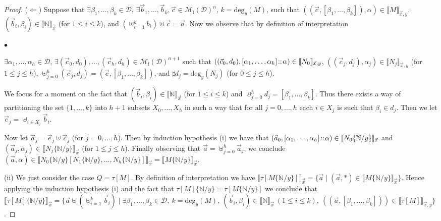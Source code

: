 \documentclass{LMCS}
\newcommand{\st}{ \mid }
\newcommand{\subst}[2]{\{ #2 / #1 \}}	\newcommand{\dg}[2]{\mathrm{deg}_{#1}(#2)} \newcommand{\obsle}{\sqsubseteq_{\mathcal{O}}}
\newcommand{\Int}[1]{\llbracket #1\rrbracket} \newcommand{\trm}[1]{#1^{\textrm{--}}}
\newcommand{\Mfin}[1]{\mathcal{M}_{\mathrm{f}}(#1)}
\newcommand{\mcup}{\uplus}
\newcommand{\seq}[1]{\vec{#1}}
\newcommand{\sN}{\mathbb{N}}
\newcommand{\gt}{\ensuremath{\tau}}
\newcommand{\cD}{\mathcal{D}}
\begin{document}
\begin{proof}
($\Leftarrow$) Suppose that $\exists \beta_1,\ldots,\beta_k \in \cD$, $\exists \seq b_1,\ldots,\seq b_k,\seq c \in \Mfin{\cD}^n$, $k=\dg{y}{M}$, such that $((\seq c,[\beta_1,\ldots,\beta_k]),\alpha) \in \Int{M}_{\seq x,y}$, $(\seq b_i,\beta_i) \in \Int{\sN}_{\seq x}$ (for $1\le i\le k$), and $(\mcup_{i=1}^{k} b_i) \mcup \seq c = \seq a$. Now we observe that by definition of interpretation
\begin{iteMize}{$\bullet$}
\item $\exists\alpha_1,\ldots,\alpha_h \in \cD$,
        $\exists (\seq c_0,d_0),\ldots,(\seq c_h ,d_h)\in \Mfin{\cD}^{n+1}$ such that
        $((\seq c_0,d_0),[\alpha_1,\ldots,\alpha_h] \at \alpha) \in \Int{N_0}_{\seq x,y}$,
        $((\seq c_j,d_j),\alpha_j) \in \Int{N_j}_{\seq x,y}$ (for $1\le j\le h$),
        $\mcup_{j=0}^{h} (\seq c_j,d_j) = (\seq c,[\beta_1,\ldots,\beta_k])$, and
        $\sharp d_j = \dg{y}{N_j}$ (for $0\le j\le h$).
\end{iteMize}
We focus for a moment on the fact that $(\seq b_i,\beta_i) \in \Int{\sN}_{\seq x}$ (for $1\le i\le k$) and $\mcup_{j=0}^{h} d_j = [\beta_1,\ldots,\beta_k]$. Thus there exists a way of partitioning the set $\{1,\ldots,k\}$ into $h+1$ subsets $X_0, \ldots, X_h$ in such a way that for all $j =0,\ldots,h$ each  $i \in X_j$ is such that $\beta_i \in d_j$. Then we let $\seq e_j = \mcup_{i \in X_j} \seq b_i$. 

Now let $\seq a_j = \seq e_j\mcup\seq c_j$ (for $j=0,\ldots,h$). Then by induction hypothesis (i) we have that $(\seq a_0,[\alpha_1,\ldots,\alpha_h] \at \alpha)\in \Int{N_0\subst{y}{\sN}}_{\seq x}$ and $(\seq a_j,\alpha_j) \in \Int{N_j\subst{y}{\sN}}_{\seq x}$ (for $1\le j\le h$). 
Finally observing that $\seq a = \mcup_{j=0}^{h} \seq a_j$, we conclude $(\seq a,\alpha)\in \Int{N_0\subst{y}{\sN}[N_1\subst{y}{\sN},\ldots,N_h\subst{y}{\sN}]}_{\seq x} = \Int{M\subst{y}{\sN}}_{\seq x}$.

(ii) We just consider the case $Q = \gt[M]$. By definition of interpretation we have $\Int{\gt[M\subst{y}{\sN}]}_{\seq x} = \{\seq a \st (\seq a,*) \in \Int{M\subst{y}{\sN}}_{\seq x} \}$. Hence applying the induction hypothesis (i) and the fact that $\gt[M]\subst{y}{\sN} = \gt[M\subst{y}{\sN}]$ we conclude that $\Int{\gt[M]\subst{y}{\sN}}_{\seq x} = \{\seq a \mcup (\mcup_{i=1}^{k} \seq b_i) \st \exists\beta_1,\ldots,\beta_k\in \cD,\ k=\dg{y}{M},\ (\seq b_i,\beta_i)\in\Int{\sN}_{\seq x}\ (1\leq i\leq k),\ ((\seq a,[\beta_1,\ldots,\beta_k])) \in \Int{\gt[M]}_{\seq x,y} \}$.
\end{proof}
\end{document}
